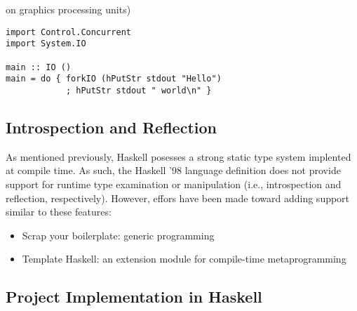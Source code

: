 \documentclass[titlepage,12pt]{article}
\newcommand{\bi}{\begin{itemize}}
\newcommand{\ei}{\end{itemize}}
\begin{document}
on graphics processing units)
\begin{verbatim}
import Control.Concurrent
import System.IO

main :: IO ()
main = do { forkIO (hPutStr stdout "Hello")
            ; hPutStr stdout " world\n" }
\end{verbatim}

\subsection{Introspection and Reflection}

As mentioned previously, Haskell posesses a strong static type system
implented at compile time. As such, the Haskell '98 language definition
does not provide support for runtime type examination or manipulation
(i.e., introspection and reflection, respectively).  However, effors have been
made toward adding support similar to these features:
\bi
    \item Scrap your boilerplate: generic programming~\cite{haskell-syb}
    \item Template Haskell: an extension module for compile-time metaprogramming~\cite{haskell-th}
\ei


\newpage
\begin{appendices}
\section{Project Implementation in Haskell}
\inputminted{haskell}{src/InfixPostfix.hs}
\newpage
\inputminted{haskell}{src/InfixPostfixTest.hs}
\end{appendices}


\newpage


\end{document}
